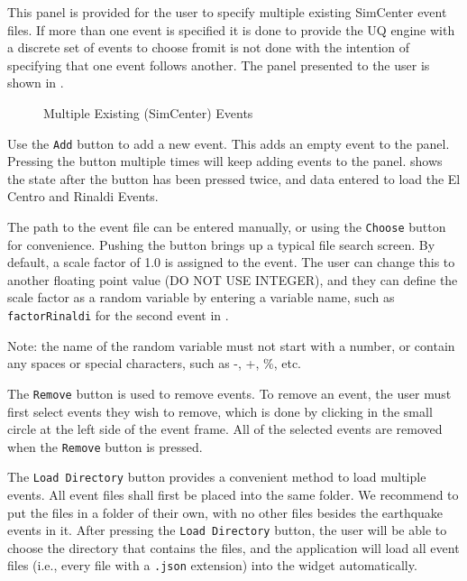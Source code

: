This panel is provided for the user to specify multiple existing SimCenter
event files.  If more than one event is specified it is done to
provide the UQ engine with a discrete set of events to choose
from\textemdash it is not done with the intention of specifying that
one event follows another.  The panel presented to the user
is shown in .

\begin{figure}[!htbp]
  \caption{Multiple Existing (SimCenter) Events }
  \label{fig:SC_event_panel}
\end{figure}

Use the \texttt{Add} button to add a new event. This adds an empty
event to the panel. Pressing the button multiple times will keep
adding events to the panel.  shows the state after
the button has been pressed twice, and data entered to load the El Centro
and Rinaldi Events.

The path to the event file can be entered manually, or using the \texttt{Choose} button for convenience. Pushing the button brings up a typical file search screen. By default, a scale factor of 1.0 is assigned to the event.  The user
can change this to another floating point value (DO NOT USE INTEGER), and they can define the scale factor as a random variable by
entering a variable name, such as \texttt{factorRinaldi} for the second event in .

Note: the name of the random variable must not start with a number, or contain any spaces or special characters, such as -, +, \%, etc.

The \texttt{Remove} button is used to remove events. To remove an
event, the user must first select events they wish to remove,
which is done by clicking in the small circle at the left side of the event frame. All of the selected events are removed when the \texttt{Remove} button is pressed.

The \texttt{Load Directory} button provides a convenient method to load multiple events. All event files shall first
be placed into the same folder. We recommend to put the files in a folder of their own, with no other files besides the earthquake events in it. After pressing the \texttt{Load Directory} button, the user will be able to choose the directory that contains the files, and the
application will load all event files (i.e., every file with a \texttt{.json} 
extension) into the widget automatically. 

